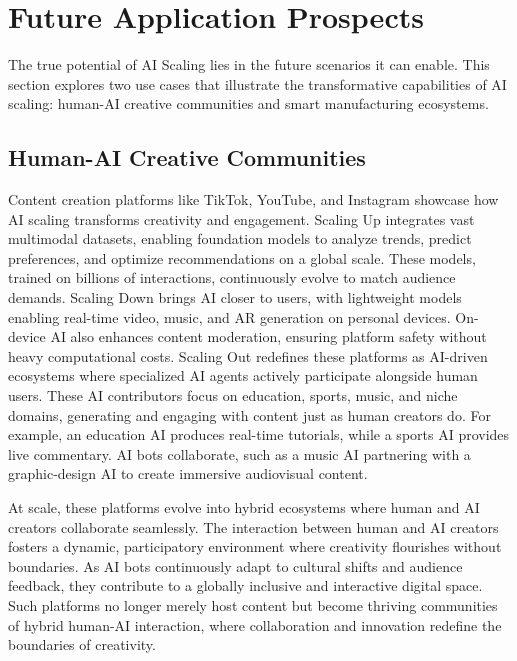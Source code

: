 \section{Future Application Prospects}
The true potential of AI Scaling lies in the future scenarios it can enable. This section explores two use cases that illustrate the transformative capabilities of AI scaling: human-AI creative communities and smart manufacturing ecosystems. 

\subsection{Human-AI Creative Communities}
Content creation platforms like TikTok, YouTube, and Instagram showcase how AI scaling transforms creativity and engagement. Scaling Up integrates vast multimodal datasets, enabling foundation models to analyze trends, predict preferences, and optimize recommendations on a global scale. These models, trained on billions of interactions, continuously evolve to match audience demands. Scaling Down brings AI closer to users, with lightweight models enabling real-time video, music, and AR generation on personal devices. On-device AI also enhances content moderation, ensuring platform safety without heavy computational costs. Scaling Out redefines these platforms as AI-driven ecosystems where specialized AI agents actively participate alongside human users. These AI contributors focus on education, sports, music, and niche domains, generating and engaging with content just as human creators do. For example, an education AI produces real-time tutorials, while a sports AI provides live commentary. AI bots collaborate, such as a music AI partnering with a graphic-design AI to create immersive audiovisual content.

At scale, these platforms evolve into hybrid ecosystems where human and AI creators collaborate seamlessly. The interaction between human and AI creators fosters a dynamic, participatory environment where creativity flourishes without boundaries. As AI bots continuously adapt to cultural shifts and audience feedback, they contribute to a globally inclusive and interactive digital space. Such platforms no longer merely host content but become thriving communities of hybrid human-AI interaction, where collaboration and innovation redefine the boundaries of creativity.


